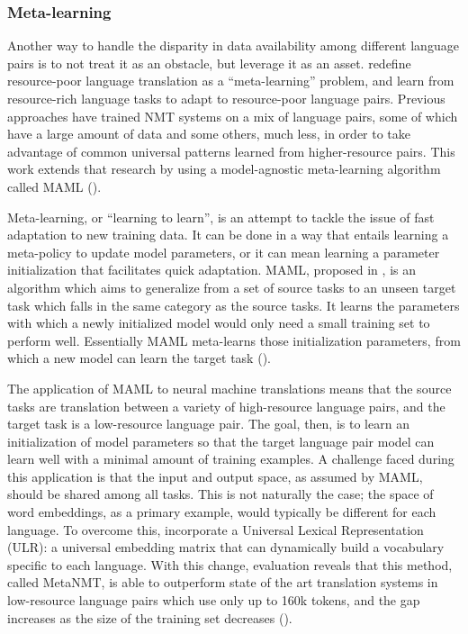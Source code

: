 \subsubsection{Meta-learning}

Another way to handle the disparity in data availability among different language pairs is to not treat it as an obstacle, but leverage it as an asset. \cite{gu2018meta} redefine resource-poor language translation as a ``meta-learning'' problem, and learn from resource-rich language tasks to adapt to resource-poor language pairs. Previous approaches have trained NMT systems on a mix of language pairs, some of which have a large amount of data and some others, much less, in order to take advantage of common universal patterns learned from higher-resource pairs. This work extends that research by using a model-agnostic meta-learning algorithm called MAML (\cite{gu2018meta}).

Meta-learning, or ``learning to learn'', is an attempt to tackle the issue of fast adaptation to new training data. It can be done in a way that entails learning a meta-policy to update model parameters, or it can mean learning a parameter initialization that facilitates quick adaptation. MAML, proposed in \cite{finn2017agnostic}, is an algorithm which aims to generalize from a set of source tasks to an unseen target task which falls in the same category as the source tasks. It learns the parameters with which a newly initialized model would only need a small training set to perform well. Essentially MAML meta-learns those initialization parameters, from which a new model can learn the target task (\cite{finn2017agnostic}).

The application of MAML to neural machine translations means that the source tasks are translation between a variety of high-resource language pairs, and the target task is a low-resource language pair. The goal, then, is to learn an initialization of model parameters so that the target language pair model can learn well with a minimal amount of training examples. A challenge faced during this application is that the input and output space, as assumed by MAML, should be shared among all tasks. This is not naturally the case; the space of word embeddings, as a primary example, would typically be different for each language. To overcome this, \cite{gu2018meta} incorporate a Universal Lexical Representation (ULR): a universal embedding matrix that can dynamically build a vocabulary specific to each language. With this change, evaluation reveals that this method, called MetaNMT, is able to outperform state of the art translation systems in low-resource language pairs which use only up to 160k tokens, and the gap increases as the size of the training set decreases (\cite{gu2018meta}).

